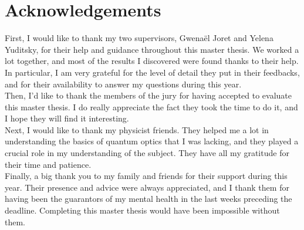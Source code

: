 \setcounter{secnumdepth}{-1}

\chapter{Acknowledgements}
\label{ch:acknowledgements}

First, I would like to thank my two supervisors, Gwenaël Joret and Yelena Yuditsky, for their help and guidance throughout this master thesis.
We worked a lot together, and most of the results I discovered were found thanks to their help.
In particular, I am very grateful for the level of detail they put in their feedbacks, and for their availability to answer my questions during this year.\\

Then, I'd like to thank the members of the jury for having accepted to evaluate this master thesis.
I do really appreciate the fact they took the time to do it, and I hope they will find it interesting.\\

Next, I would like to thank my physicist friends.
They helped me a lot in understanding the basics of quantum optics that I was lacking, and they played a crucial role in my understanding of the subject.
They have all my gratitude for their time and patience.\\

Finally, a big thank you to my family and friends for their support during this year.
Their presence and advice were always appreciated, and I thank them for having been the guarantors of my mental health in the last weeks preceding the deadline.
Completing this master thesis would have been impossible without them.\\
